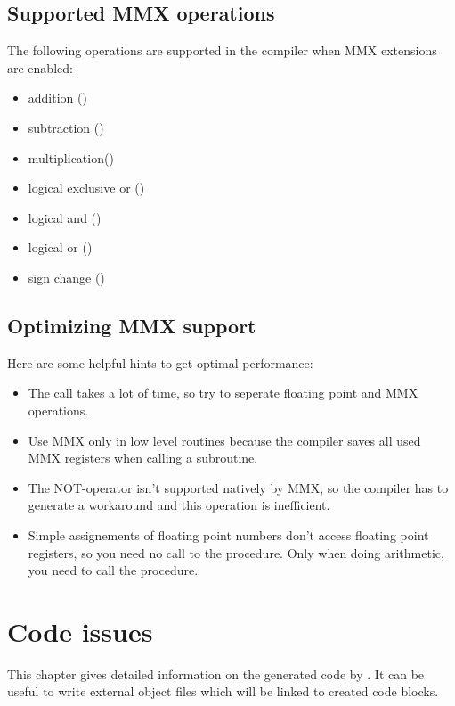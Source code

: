 \section{Supported MMX operations}
\label{se:SupportedMMX}
The following operations are supported in the compiler when MMX
extensions are enabled:
\begin{itemize}
\item addition (\var{+})
\item subtraction (\var{-})
\item multiplication(\var{*})
\item logical exclusive or ()
\item logical and ()
\item logical or ()
\item sign change (\var{-})
\end{itemize}

\section{Optimizing MMX support}
\label{se:OptimizingMMX}
Here are some helpful hints to get optimal performance:
\begin{itemize}
\item The  call takes a lot of time, so try to seperate floating
point and MMX operations.
\item Use MMX only in low level routines because the compiler
  saves all used MMX registers when calling a subroutine.
\item The NOT-operator isn't supported natively by MMX, so the
  compiler has to generate a workaround and this operation
  is inefficient.
\item Simple assignements of floating point numbers don't access
  floating point registers, so you need no call to the 
  procedure. Only when doing arithmetic, you need to call the 
procedure.
\end{itemize}

\chapter{Code issues}
\label{ch:Code}

This chapter gives detailed information on the generated code by
\fpc. It can be useful to write external object files which will
be linked to \fpc created code blocks.


